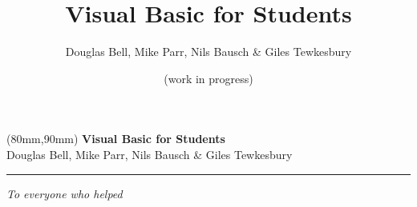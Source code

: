 \documentclass[twoside=off,10pt,a4paper,BCOR=0pt,DIV=8]{scrbook}
\begin{document}
\title{Visual Basic for Students}
\author{Douglas Bell, Mike Parr, Nils Bausch \& Giles Tewkesbury}
\date{  (work in progress)}
\titlehead{}
\publishers{Published by Nils Bausch}





	\maketitle 

	\thispagestyle{empty}
	\null\newpage

	
	\thispagestyle{empty}
	\begin{textblock*}{80mm}(80mm,90mm)
	\noindent
	{\sffamily\LARGE\bfseries Visual Basic for Students}\\
	\noindent
		{\sffamily\small Douglas Bell, Mike Parr, Nils Bausch \& Giles Tewkesbury}\\
	{\color{darkgray}\rule[5pt]{225pt}{3pt}}
	\end{textblock*}
	\null\newpage

	\thispagestyle{empty}
	

	\thispagestyle{empty}
	\null
	\vspace*{\fill}
	\hfill\textit{To everyone who helped}
	\vspace*{\fill}
	\newpage

	\thispagestyle{empty}
	\null\newpage


	\frontmatter 
	\tableofcontents 
	\listoffigures 
	\listoftables 


	
	



\mainmatter 



















%
%
%
%
%
%
%



\end{document}
